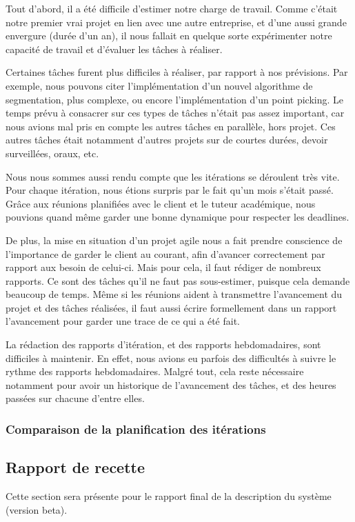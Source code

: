 \documentclass[12pt,titlepage,french]{article}
\begin{document}
Tout d'abord, il a été difficile d'estimer notre charge de travail. Comme c'était notre premier vrai projet en lien avec une autre entreprise, et d'une aussi grande envergure (durée d'un an), il nous fallait en quelque sorte expérimenter notre capacité de travail et d'évaluer les tâches à réaliser.

Certaines tâches furent plus difficiles à réaliser, par rapport à nos prévisions. Par exemple, nous pouvons citer l'implémentation d'un nouvel algorithme de segmentation, plus complexe, ou encore l'implémentation d'un point picking. Le temps prévu à consacrer sur ces types de tâches n'était pas assez important, car nous avions mal pris en compte les autres tâches en parallèle, hors projet. Ces autres tâches était notamment d'autres projets sur de courtes durées, devoir surveillées, oraux, etc. \newline

Nous nous sommes aussi rendu compte que les itérations se déroulent très vite. Pour chaque itération, nous étions surpris par le fait qu'un mois s'était passé. Grâce aux réunions planifiées avec le client et le tuteur académique, nous pouvions quand même garder une bonne dynamique pour respecter les deadlines. \newline

De plus, la mise en situation d'un projet agile nous a fait prendre conscience de l'importance de garder le client au courant, afin d'avancer correctement par rapport aux besoin de celui-ci. Mais pour cela, il faut rédiger de nombreux rapports. Ce sont des tâches qu'il ne faut pas sous-estimer, puisque cela demande beaucoup de temps. Même si les réunions aident à transmettre l'avancement du projet et des tâches réalisées, il faut aussi écrire formellement dans un rapport l'avancement pour garder une trace de ce qui a été fait.

La rédaction des rapports d'itération, et des rapports hebdomadaires, sont difficiles à maintenir. En effet, nous avions eu parfois des difficultés à suivre le rythme des rapports hebdomadaires. Malgré tout, cela reste nécessaire notamment pour avoir un historique de l'avancement des tâches, et des heures passées sur chacune d'entre elles.

\subsubsection{Comparaison de la planification des itérations}

\subsection{Rapport de recette}

Cette section sera présente pour le rapport final de la description du système (version beta).
\end{document}
